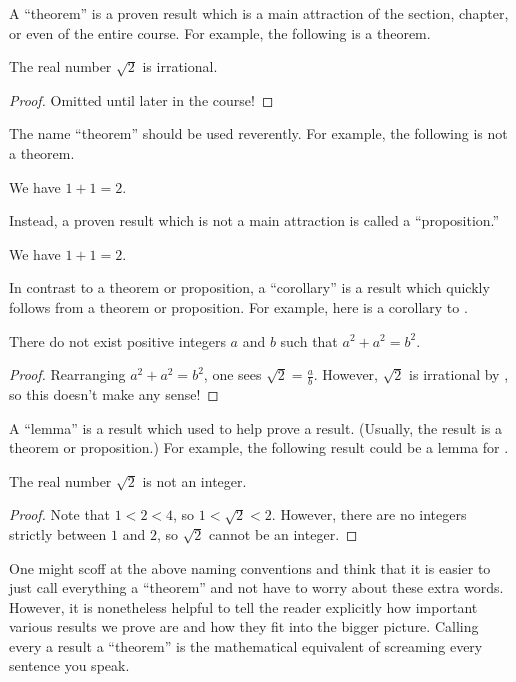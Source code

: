 \documentclass[../main.tex]{subfiles}
\begin{document}
A ``theorem'' is a proven result which is a main attraction of the section, chapter, or even of the entire course. For example, the following is a theorem.
\begin{theorem}[Wiles] \label{thm:root-2-is-irrational}
    The real number $\sqrt2$ is irrational.
\end{theorem}
\begin{proof}
    Omitted until later in the course!
\end{proof}
The name ``theorem'' should be used reverently. For example, the following is not a theorem.
\begin{theorem}
    We have $1+1=2$.
\end{theorem}
Instead, a proven result which is not a main attraction is called a ``proposition.''
\begin{proposition}
    We have $1+1=2$.
\end{proposition}
In contrast to a theorem or proposition, a ``corollary'' is a result which quickly follows from a theorem or proposition. For example, here is a corollary to .
\begin{corollary}
    There do not exist positive integers $a$ and $b$ such that $a^2+a^2=b^2$.
\end{corollary}
\begin{proof}
    Rearranging $a^2+a^2=b^2$, one sees $\sqrt2=\frac ab$. However, $\sqrt2$ is irrational by , so this doesn't make any sense!
\end{proof}
A ``lemma'' is a result which used to help prove a result. (Usually, the result is a theorem or proposition.) For example, the following result could be a lemma for .
\begin{lemma}
    The real number $\sqrt2$ is not an integer.
\end{lemma}
\begin{proof}
    Note that $1<2<4$, so $1<\sqrt2<2$. However, there are no integers strictly between $1$ and $2$, so $\sqrt2$ cannot be an integer.
\end{proof}
One might scoff at the above naming conventions and think that it is easier to just call everything a ``theorem'' and not have to worry about these extra words. However, it is nonetheless helpful to tell the reader explicitly how important various results we prove are and how they fit into the bigger picture. Calling every a result a ``theorem'' is the mathematical equivalent of screaming every sentence you speak.
\end{document}
